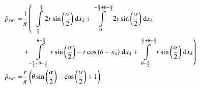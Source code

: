 \begin{align}
    \bar{p}_{\text{\tiny{SW3}}} =&\frac{1}{\pi} \left(\;\;\int\limits_{\frac{\theta}{2}}^{\frac{\pi}{2}}2 r \sin{\left (\frac{\alpha}{2} \right )}\;\mathrm{d}x_{2}+\int\limits_{0}^{- \frac{\pi}{2} + \theta - \frac{\alpha}{2}}2 r \sin{\left (\frac{\alpha}{2} \right )}\;\mathrm{d}x_{4}\right.\notag\\
 &\left.+\int\limits_{- \frac{\pi}{2} + \theta - \frac{\alpha}{2}}^{\theta - \frac{\pi}{2}}r \sin{\left (\frac{\alpha}{2} \right )} - r \cos{\left (\theta - x_{4} \right )}\;\mathrm{d}x_{4}+\int\limits_{\theta - \frac{\pi}{2}}^{\frac{\alpha}{2} + \theta - \frac{\pi}{2}}r \sin{\left (\frac{\alpha}{2} \right )}\;\mathrm{d}x_{4}\right)\label{pSW3Def}\\
    \bar{p}_{\text{\tiny{SW3}}}  =& \frac{r}{\pi} \left(\theta \sin{\left (\frac{\alpha}{2} \right )} - \cos{\left (\frac{\alpha}{2} \right )} + 1\right)\label{pSW3Sln}
\end{align}